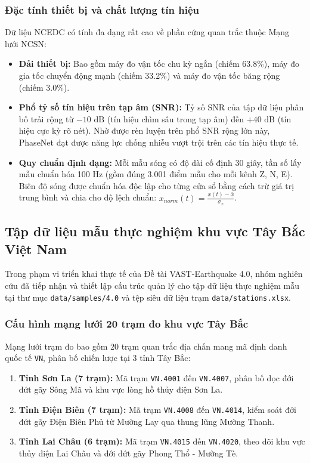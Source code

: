 \documentclass[preprint,1p]{elsarticle}
\begin{document}
\subsubsection{Đặc tính thiết bị và chất lượng tín hiệu}
Dữ liệu NCEDC có tính đa dạng rất cao về phần cứng quan trắc thuộc Mạng lưới NCSN:
\begin{itemize}
    \item \textbf{Dải thiết bị:} Bao gồm máy đo vận tốc chu kỳ ngắn (chiếm 63.8\%), máy đo gia tốc chuyển động mạnh (chiếm 33.2\%) và máy đo vận tốc băng rộng (chiếm 3.0\%).
    \item \textbf{Phổ tỷ số tín hiệu trên tạp âm (SNR):} Tỷ số SNR của tập dữ liệu phân bố trải rộng từ $-10\text{ dB}$ (tín hiệu chìm sâu trong tạp âm) đến $+40\text{ dB}$ (tín hiệu cực kỳ rõ nét). Nhờ được rèn luyện trên phổ SNR rộng lớn này, PhaseNet đạt được năng lực chống nhiễu vượt trội trên các tín hiệu thực tế.
    \item \textbf{Quy chuẩn định dạng:} Mỗi mẫu sóng có độ dài cố định 30 giây, tần số lấy mẫu chuẩn hóa 100 Hz (gồm đúng 3.001 điểm mẫu cho mỗi kênh Z, N, E). Biên độ sóng được chuẩn hóa độc lập cho từng cửa sổ bằng cách trừ giá trị trung bình và chia cho độ lệch chuẩn: $x_{norm}(t) = \frac{x(t) - \bar{x}}{\sigma_x}$.
\end{itemize}

\subsection{Tập dữ liệu mẫu thực nghiệm khu vực Tây Bắc Việt Nam}
\label{sec:dataset_samples}

Trong phạm vi triển khai thực tế của Đề tài VAST-Earthquake 4.0, nhóm nghiên cứu đã tiếp nhận và thiết lập cấu trúc quản lý cho tập dữ liệu thực nghiệm mẫu tại thư mục \texttt{data/samples/4.0} và tệp siêu dữ liệu trạm \texttt{data/stations.xlsx}.

\subsubsection{Cấu hình mạng lưới 20 trạm đo khu vực Tây Bắc}
Mạng lưới trạm đo bao gồm 20 trạm quan trắc địa chấn mang mã định danh quốc tế \texttt{VN}, phân bố chiến lược tại 3 tỉnh Tây Bắc:
\begin{enumerate}
    \item \textbf{Tỉnh Sơn La (7 trạm):} Mã trạm \texttt{VN.4001} đến \texttt{VN.4007}, phân bố dọc đới đứt gãy Sông Mã và khu vực lòng hồ thủy điện Sơn La.
    \item \textbf{Tỉnh Điện Biên (7 trạm):} Mã trạm \texttt{VN.4008} đến \texttt{VN.4014}, kiểm soát đới đứt gãy Điện Biên Phủ từ Mường Lay qua thung lũng Mường Thanh.
    \item \textbf{Tỉnh Lai Châu (6 trạm):} Mã trạm \texttt{VN.4015} đến \texttt{VN.4020}, theo dõi khu vực thủy điện Lai Châu và đới đứt gãy Phong Thổ - Mường Tè.
\end{enumerate}
\end{document}
